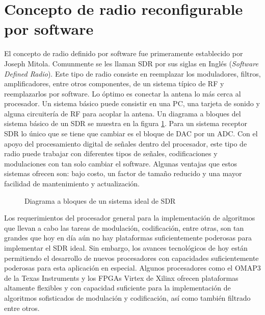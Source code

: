 \section{Concepto de radio reconfigurable por software}

El concepto de radio definido por software fue primeramente establecido por Joseph Mitola\cite{mitola}. Comunmente se les
llaman SDR por sus siglas en Ingl\'es (\emph{Software Defined Radio}). Este tipo de radio consiste en reemplazar los moduladores,
filtros, amplificadores, entre otros componentes, de un sistema t\'ipico de RF y reemplazarlos por software. Lo \'optimo
es conectar la antena lo m\'as cerca al procesador. Un sistema b\'asico puede consistir en una PC, una tarjeta de sonido y alguna
circuiter\'ia de RF para acoplar la antena. Un diagrama a bloques del sistema b\'asico de un SDR se muestra en la figura \ref{fig:sdr}. Para un
sistema receptor SDR lo \'unico que se tiene que cambiar es el bloque de DAC por un ADC. Con el apoyo del procesamiento digital de
se\~nales dentro del procesador, este tipo de radio puede trabajar con diferentes tipos de se\~nales, codificaciones y
modulaciones con tan solo cambiar el software. Algunas ventajas que estos sistemas ofrecen son: bajo costo, un factor de tama\~no
reducido y una mayor facilidad de mantenimiento y actualizaci\'on.

\begin{figure}[tp]
\centering
	\vspace{0.3in}
	\caption{Diagrama a bloques de un sistema ideal de SDR}
	\label{fig:sdr}
\end{figure}

Los requerimientos del procesador general para la implementaci\'on de algoritmos que llevan a cabo las tareas de modulaci\'on,
codificaci\'on, entre otras, son tan grandes que hoy en d\'ia a\'un no hay plataformas suficientemente poderosas para implementar
el SDR ideal. Sin embargo, los avances tecnol\'ogicos de hoy est\'an permitiendo el desarrollo de nuevos procesadores con capacidades
suficientemente poderosas para esta aplicaci\'on en especial. Algunos procesadores como el OMAP3 de la Texas Instruments
\cite{ti} y los FPGAs Virtex de Xilinx \cite{lyrtech} ofrecen plataformas altamente flexibles y con capacidad suficiente para la
implementaci\'on de algoritmos sofisticados de modulaci\'on y codificaci\'on, as\'i como tambi\'en filtrado entre otros.

